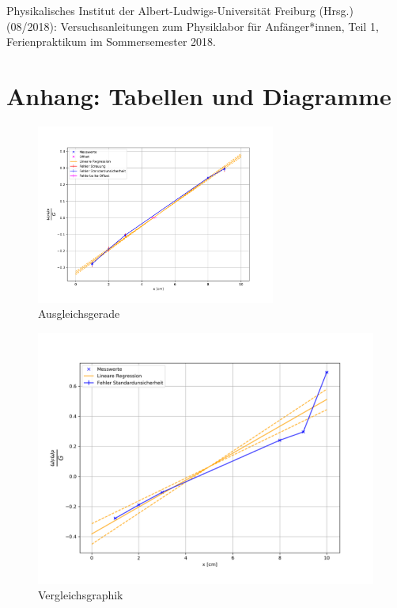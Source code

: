 \documentclass[11pt,a4paper]{article}
\begin{document}





\vfill
\begin{thebibliography}{9}
 Physikalisches Institut der Albert-Ludwigs-Universität Freiburg (Hrsg.) (08/2018): Versuchsanleitungen zum Physiklabor für Anfänger*innen, Teil 1, Ferienpraktikum im Sommersemester 2018.
\end{thebibliography}

\pagebreak

\section{Anhang: Tabellen und Diagramme}

\begin{figure}[h]
\centering
\includegraphics[width=0.7\textwidth]{discluding_10.png}
\renewcommand\thefigure{1} \vspace{-20pt} 
\caption[Graphik Messpunkte mit Ausgleichsgerade]{Ausgleichsgerade}
\label{Abb:1}
\end{figure}

\begin{figure}[h]
\centering
\includegraphics[width=.7\textwidth]{including_10.png}
\renewcommand\thefigure{2} \vspace{-20pt} 
\caption[Vergleichsgraphik]{Vergleichsgraphik}
\label{Abb:2}
\end{figure}
\end{document}

